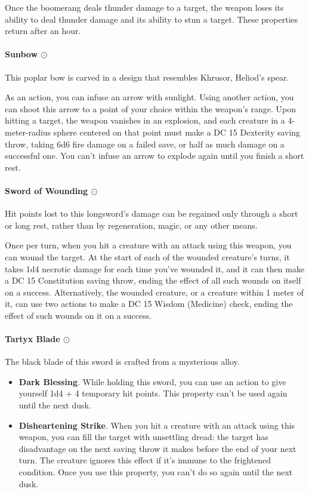         Once the boomerang deals thunder damage to a target, the weapon loses its ability to deal thunder damage and its ability to stun a target.
        These properties return after an hour.
    \paragraph{Sunbow $\odot$}
        This poplar bow is carved in a design that resembles Khrusor, Heliod's spear.

        As an action, you can infuse an arrow with sunlight.
        Using another action, you can shoot this arrow to a point of your choice within the weapon's range.
        Upon hitting a target, the weapon vanishes in an explosion, and each creature in a 4-meter-radius sphere centered on that point must make a DC 15 Dexterity saving throw, taking 6d6 fire damage on a failed save, or half as much damage on a successful one.
        You can't infuse an arrow to explode again until you finish a short rest.
    \paragraph{Sword of Wounding $\odot$}
        Hit points lost to this longsword's damage can be regained only through a short or long rest, rather than by regeneration, magic, or any other means.

        Once per turn, when you hit a creature with an attack using this weapon, you can wound the target.
        At the start of each of the wounded creature's turns, it takes 1d4 necrotic damage for each time you've wounded it, and it can then make a DC 15 Constitution saving throw, ending the effect of all such wounds on itself on a success.
        Alternatively, the wounded creature, or a creature within 1 meter of it, can use two actions to make a DC 15 Wisdom (Medicine) check, ending the effect of such wounds on it on a success.
    \paragraph{Tartyx Blade $\odot$}
        The black blade of this sword is crafted from a mysterious alloy.
        \begin{itemize}
            \item \textbf{Dark Blessing}.
            While holding this sword, you can use an action to give yourself 1d4 + 4 temporary hit points.
            This property can't be used again until the next dusk.
            \item \textbf{Disheartening Strike}.
            When you hit a creature with an attack using this weapon, you can fill the target with unsettling dread: the target has disadvantage on the next saving throw it makes before the end of your next turn.
            The creature ignores this effect if it's immune to the frightened condition.
            Once you use this property, you can't do so again until the next dusk.
        \end{itemize}
